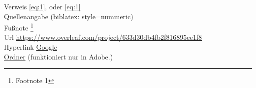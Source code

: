 Verweis \ref{eq:1}, oder \autoref{eq:1}\\
Quellenangabe \cite{citation-example} (biblatex: style=nummeric)\\ 
Fußnote \footnote{Footnote 1}\\
Url \url{https://www.overleaf.com/project/633d30db4fb2f816895ee1f8}\\
Hyperlink \href{https://www.google.com/}{Google}\\
\href{run:C:/Users/jonathan.mayer/Studium/01_Wintersemester_22_23/01_MM_Mathematische_Methoden der Physik/313.208_Vorlesung/MathMeth_gesamt.pdf}{Ordner} (funktioniert nur in Adobe.)\\